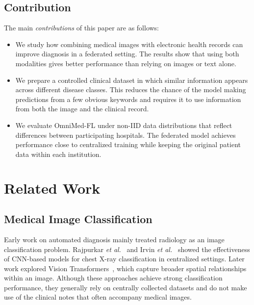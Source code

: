 \documentclass[letterpaper, conference]{IEEEtran}
\begin{document}
\subsection{Contribution}
The main \textit{contributions} of this paper are as follows:
\begin{itemize}
\item We study how combining medical images with electronic health records can improve diagnosis in a federated setting. The results show that using both modalities gives better performance than relying on images or text alone.

\item We prepare a controlled clinical dataset in which similar information appears across different disease classes. This reduces the chance of the model making predictions from a few obvious keywords and requires it to use information from both the image and the clinical record.

\item We evaluate OmniMed-FL under non-IID data distributions that reflect differences between participating hospitals. The federated model achieves performance close to centralized training while keeping the original patient data within each institution.
\end{itemize}


\section{Related Work}

\subsection{Medical Image Classification}
Early work on automated diagnosis mainly treated radiology as an image classification problem. Rajpurkar \textit{et al.}~\cite{Rajpurkar2017} and Irvin \textit{et al.}~\cite{Irvin2019} showed the effectiveness of CNN-based models for chest X-ray classification in centralized settings. Later work explored Vision Transformers~\cite{Dosovitskiy2021,Liu2021swin}, which capture broader spatial relationships within an image. Although these approaches achieve strong classification performance, they generally rely on centrally collected datasets and do not make use of the clinical notes that often accompany medical images.
\end{document}
